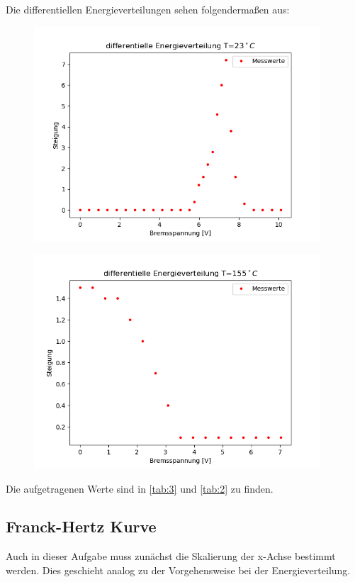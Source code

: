 \noindent Die differentiellen Energieverteilungen sehen folgendermaßen aus:

\begin{figure}[H]
    \centering
    \includegraphics[height=8cm]{"8a1.png"}
\end{figure}

\begin{figure}[H]
    \centering
    \includegraphics[height=8cm]{"8a2.png"}
\end{figure}

Die aufgetragenen Werte sind in \ref{tab:3} und \ref{tab:2} zu finden.

\subsection{Franck-Hertz Kurve}

Auch in dieser Aufgabe muss zunächst die Skalierung der x-Achse bestimmt werden.
Dies geschieht analog zu der Vorgehensweise bei der Energieverteilung.


